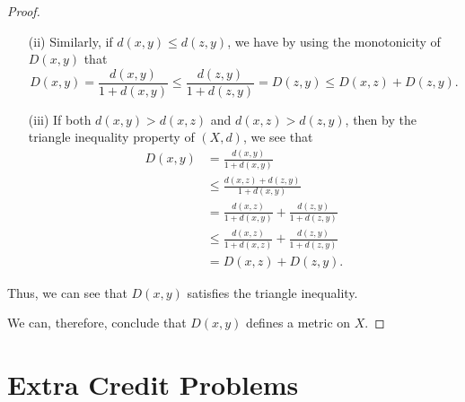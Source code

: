 \documentclass{article}
\begin{document}
\begin{enumerate}
\begin{proof}
\begin{enumerate}
\begin{enumerate}
                \item[(ii)] Similarly, if \( d(x,y) \leq d(z,y) \), we have by using the monotonicity of \( D(x,y) \) that
                    \[  D(x,y) = \frac{ d(x,y) }{  1 + d(x,y) } \leq \frac{ d(z,y) }{ 1 + d(z,y) } = D(z,y) \leq D(x,z) + D(z,y). \]
                \item[(iii)] If both \( d(x,y) > d(x,z) \) and \( d(x,z) > d(z,y) \), then by the triangle inequality property of \( (X,d) \), we see that                   
                    \begin{align*}
                    D(x,y) &= \frac{ d(x,y) }{ 1 + d(x,y) }  \\
                           &\leq \frac{ d(x,z) + d(z,y)  }{ 1 + d(x,y) } \\
                           &= \frac{ d(x,z) }{ 1 + d(x,y)  }  + \frac{ d(z,y) }{ 1 + d(z,y) } \\
                           &\leq \frac{ d(x,z) }{ 1 + d(x,z) }  + \frac{ d(z,y) }{ 1 + d(z,y) } \\
                           &= D(x,z) + D(z,y).
                \end{align*} 
            \end{enumerate}
            Thus, we can see that \( D(x,y) \) satisfies the triangle inequality.
    \end{enumerate}
    We can, therefore, conclude that \( D(x,y) \) defines a metric on \( X  \).
    \end{proof}
\end{enumerate}

\section*{Extra Credit Problems}
\end{document}
